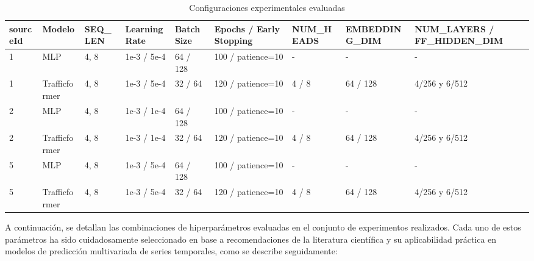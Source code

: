 \begin{table}[H]
	\centering
	\caption{Configuraciones experimentales evaluadas}
	\label{tab:experimentos_resumen}
	\begin{tabularx}{\textwidth}{l | l | l | l | l | l | l | l | l}
		\toprule
		\textbf{sourceId} & \textbf{Modelo} & \textbf{SEQ\_LEN} & \textbf{Learning Rate} & \textbf{Batch Size} & \textbf{Epochs / Early Stopping} & \textbf{NUM\_HEADS} & \textbf{EMBEDDING\_DIM} & \textbf{NUM\_LAYERS / FF\_HIDDEN\_DIM} \\
		\midrule
		1 & MLP           & 4, 8 & 1e-3 / 5e-4 & 64 / 128 & 100 / patience=10 & -      & -       & - \\
		1 & Trafficformer & 4, 8 & 1e-3 / 5e-4 & 32 / 64  & 120 / patience=10 & 4 / 8  & 64 / 128 & 4/256 y 6/512 \\
		2 & MLP           & 4, 8 & 1e-3 / 1e-4 & 64 / 128 & 100 / patience=10 & -      & -       & - \\
		2 & Trafficformer & 4, 8 & 1e-3 / 1e-4 & 32 / 64  & 120 / patience=10 & 4 / 8  & 64 / 128 & 4/256 y 6/512 \\
		5 & MLP           & 4, 8 & 1e-3 / 5e-4 & 64 / 128 & 100 / patience=10 & -      & -       & - \\
		5 & Trafficformer & 4, 8 & 1e-3 / 5e-4 & 32 / 64  & 120 / patience=10 & 4 / 8  & 64 / 128 & 4/256 y 6/512 \\
		\bottomrule
	\end{tabularx}
\end{table}

A continuación, se detallan las combinaciones de hiperparámetros evaluadas en el conjunto de experimentos realizados. Cada uno de estos parámetros ha sido cuidadosamente seleccionado en base a recomendaciones de la literatura científica y su aplicabilidad práctica en modelos de predicción multivariada de series temporales, como se describe seguidamente:

